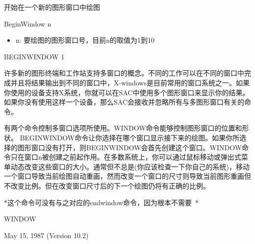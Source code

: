 \label{cmd:beginwindow}

开始在一个新的图形窗口中绘图

BeginWindow n

\begin{itemize}
\item n: 要绘图的图形窗口号，目前n的取值为1到10
\end{itemize}

BEGINWINDOW 1

许多新的图形终端和工作站支持多窗口的概念。不同的工作可以在不同的窗口中完成并且将结果输出到不同的窗口中，X-windows是目前常用的窗口系统之一。如果你使用的设备支持X系统，你就可以在SAC中使用多个图形窗口来显示你的结果。如果你没有使用这样一个设备，那么SAC会接收并忽略所有与多图形窗口有关的命令。

有两个命令控制多窗口选项所使用。WINDOW命令能够控制图形窗口的位置和形状。	BEGINWINDOW命令让你选择在哪个窗口显示接下来的绘图。如果你所选择的图形窗口没有打开，则BEGINWINDOW会首先创建这个窗口。WINDOW命令只在窗口n被创建之前起作用。在多数系统上，你可以通过鼠标移动或弹出式菜单动态改变这些窗口的大小。通常但不总是(你应该检查一下你自己的系统)，移动一个窗口导致当前绘图自动重画，然而改变一个窗口的尺寸则导致当前图形重画但不改变比例。但在改变窗口尺寸后的下一个绘图仍将有正确的比例。

*这个命令可没有与之对应的endwindow命令，因为根本不需要~*

WINDOW

May 15, 1987 (Version 10.2)
